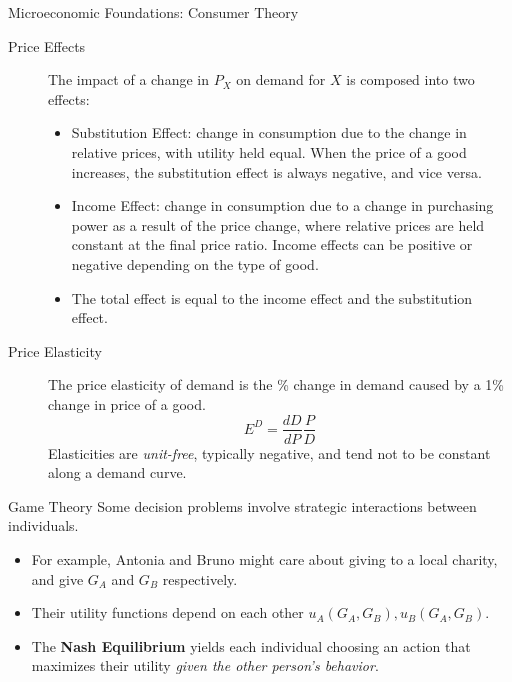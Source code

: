 \documentclass[8pt]{extarticle}
\begin{document}
\begin{problem}{Microeconomic Foundations: Consumer Theory}
\begin{description}
\begin{itemize}
        \end{itemize}
      \item[Price Effects] The impact of a change in $P_X$ on demand for $X$ is composed into two effects:
        \begin{itemize}
          \item Substitution Effect: change in consumption due to the change in relative prices, with utility held equal. When the price of a good increases, the substitution effect is always negative, and vice versa.
          \item Income Effect: change in consumption due to a change in purchasing power as a result of the price change, where relative prices are held constant at the final price ratio. Income effects can be positive or negative depending on the type of good.
          \item The total effect is equal to the income effect and the substitution effect.
        \end{itemize}
    \end{description}
    \begin{center}
      \begin{tcbraster}[raster columns = 1,colframe = black!75!white,colback=white,title=Income and Substitution Effects]
      \end{tcbraster}
    \end{center}
    \begin{description}
      \item[Price Elasticity] The price elasticity of demand is the \% change in demand caused by a 1\% change in price of a good.
        \[
          E^D = \frac{dD}{dP}\frac{P}{D}
        \] 
      Elasticities are \textit{unit-free}, typically negative, and tend not to be constant along a demand curve.
    \end{description}
  \end{problem}
  \begin{problem}{Game Theory}
    Some decision problems involve strategic interactions between individuals.
    \begin{itemize}
      \item For example, Antonia and Bruno might care about giving to a local charity, and give $G_A$ and $G_B$ respectively. 
      \item Their utility functions depend on each other $u_A(G_A,G_B),u_B(G_A,G_B)$.
      \item The \textbf{Nash Equilibrium} yields each individual choosing an action that maximizes their utility \textit{given the other person's behavior}.
    \end{itemize}
  \end{problem}
\end{document}
